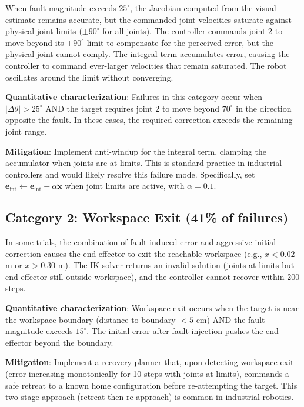 \documentclass[12pt,a4paper,oneside]{report}
\begin{document}
When fault magnitude exceeds $25^\circ$, the Jacobian computed from the visual estimate remains accurate, but the commanded joint velocities saturate against physical joint limits ($\pm90^\circ$ for all joints). The controller commands joint 2 to move beyond its $\pm90^\circ$ limit to compensate for the perceived error, but the physical joint cannot comply. The integral term accumulates error, causing the controller to command ever-larger velocities that remain saturated. The robot oscillates around the limit without converging.

\textbf{Quantitative characterization}: Failures in this category occur when $|\Delta \theta| > 25^\circ$ AND the target requires joint 2 to move beyond $70^\circ$ in the direction opposite the fault. In these cases, the required correction exceeds the remaining joint range.

\textbf{Mitigation}: Implement anti-windup for the integral term, clamping the accumulator when joints are at limits. This is standard practice in industrial controllers and would likely resolve this failure mode. Specifically, set $\mathbf{e}_{\text{int}} \leftarrow \mathbf{e}_{\text{int}} - \alpha \tilde{\mathbf{x}}$ when joint limits are active, with $\alpha = 0.1$.

\subsection{Category 2: Workspace Exit (41\% of failures)}

In some trials, the combination of fault-induced error and aggressive initial correction causes the end-effector to exit the reachable workspace (e.g., $x < 0.02$ m or $x > 0.30$ m). The IK solver returns an invalid solution (joints at limits but end-effector still outside workspace), and the controller cannot recover within 200 steps.

\textbf{Quantitative characterization}: Workspace exit occurs when the target is near the workspace boundary (distance to boundary $< 5$ cm) AND the fault magnitude exceeds $15^\circ$. The initial error after fault injection pushes the end-effector beyond the boundary.

\textbf{Mitigation}: Implement a recovery planner that, upon detecting workspace exit (error increasing monotonically for 10 steps with joints at limits), commands a safe retreat to a known home configuration before re-attempting the target. This two-stage approach (retreat then re-approach) is common in industrial robotics.
\end{document}
